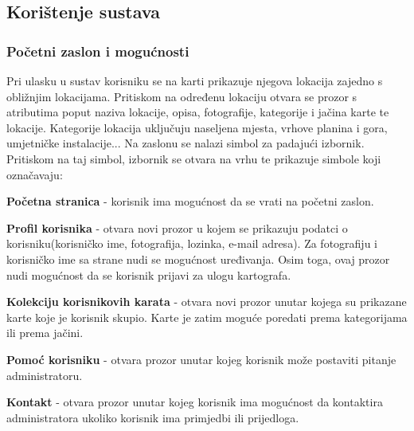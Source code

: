 		\subsection{Korištenje sustava}
		
		\subsubsection{Početni zaslon i mogućnosti}
		
		{Pri ulasku u sustav korisniku se na karti prikazuje njegova lokacija zajedno s obližnjim lokacijama. Pritiskom na određenu lokaciju otvara se prozor s atributima poput naziva lokacije, opisa, fotografije, kategorije i jačina karte te lokacije. Kategorije lokacija uključuju naseljena mjesta, vrhove planina i gora, umjetničke instalacije... Na zaslonu se nalazi simbol za padajući izbornik. Pritiskom na taj simbol, izbornik se otvara na vrhu te prikazuje simbole koji označavaju:  }
		
			\begin{packed_item}
			\item {\textbf{Početna stranica} - korisnik ima mogućnost da se vrati na početni zaslon. }\\
			\item {\textbf{Profil korisnika }- otvara novi prozor u kojem se prikazuju podatci o korisniku(korisničko ime, fotografija, lozinka, e-mail adresa). Za fotografiju i korisničko ime sa strane nudi se mogućnost uređivanja. Osim toga, ovaj prozor nudi mogućnost da se korisnik prijavi za ulogu kartografa.}\\
			\item {\textbf{Kolekciju korisnikovih karata} - otvara novi prozor unutar kojega su prikazane karte koje je korisnik skupio. Karte je zatim moguće poredati prema kategorijama ili prema jačini.}\\
			\item {\textbf{Pomoć korisniku} - otvara prozor unutar kojeg korisnik može postaviti pitanje administratoru.}\\
			\item {\textbf{Kontakt} - otvara prozor unutar kojeg korisnik ima mogućnost da kontaktira administratora ukoliko korisnik ima primjedbi ili prijedloga.}
			\end{packed_item}
		
